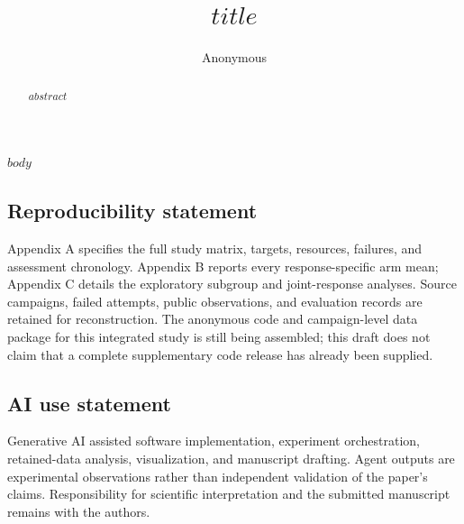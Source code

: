 \documentclass{article}
\title{$title$}
\author{Anonymous}
\begin{document}
\maketitle
\raggedbottom
\begin{abstract}
$abstract$
\end{abstract}
$body$
\FloatBarrier
\label{main-text-end}
\clearpage
\subsection*{Reproducibility statement}
Appendix A specifies the full study matrix, targets, resources, failures, and
assessment chronology. Appendix B reports every response-specific arm mean;
Appendix C details the exploratory subgroup and joint-response analyses.
Source campaigns, failed attempts, public observations, and evaluation records
are retained for reconstruction. The anonymous code and campaign-level data
package for this integrated study is still being assembled; this draft does not
claim that a complete supplementary code release has already been supplied.
\subsection*{AI use statement}
Generative AI assisted software implementation, experiment orchestration,
retained-data analysis, visualization, and manuscript drafting. Agent outputs are
experimental observations rather than independent validation of the paper's claims.
Responsibility for scientific interpretation and the submitted manuscript remains
with the authors.


\clearpage
\appendix

\end{document}

